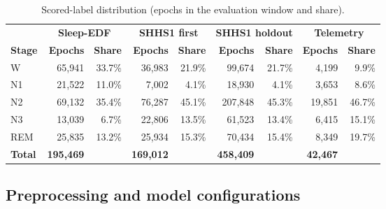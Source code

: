 \documentclass[11pt,a4paper]{article}
\begin{document}
\begin{table}[t]
\centering
\caption{Scored-label distribution (epochs in the evaluation window and share).}
\label{tab:class-distribution}
\small
\begin{tabular}{lrr|rr|rr|rr}
\toprule
& \multicolumn{2}{c|}{\textbf{Sleep-EDF}} & \multicolumn{2}{c|}{\textbf{SHHS1 first}} & \multicolumn{2}{c|}{\textbf{SHHS1 holdout}} & \multicolumn{2}{c}{\textbf{Telemetry}} \\
\textbf{Stage} & \textbf{Epochs} & \textbf{Share} & \textbf{Epochs} & \textbf{Share} & \textbf{Epochs} & \textbf{Share} & \textbf{Epochs} & \textbf{Share} \\
\midrule
W   & 65{,}941 & 33.7\% & 36{,}983 & 21.9\% & 99{,}674  & 21.7\% & 4{,}199  & 9.9\% \\
N1  & 21{,}522 & 11.0\% & 7{,}002  & 4.1\%  & 18{,}930  & 4.1\%  & 3{,}653  & 8.6\% \\
N2  & 69{,}132 & 35.4\% & 76{,}287 & 45.1\% & 207{,}848 & 45.3\% & 19{,}851 & 46.7\% \\
N3  & 13{,}039 & 6.7\%  & 22{,}806 & 13.5\% & 61{,}523  & 13.4\% & 6{,}415  & 15.1\% \\
REM & 25{,}835 & 13.2\% & 25{,}934 & 15.3\% & 70{,}434  & 15.4\% & 8{,}349  & 19.7\% \\
\midrule
\textbf{Total} & \textbf{195{,}469} & & \textbf{169{,}012} & & \textbf{458{,}409} & & \textbf{42{,}467} & \\
\bottomrule
\end{tabular}
\end{table}

\subsection{Preprocessing and model configurations}
\end{document}
